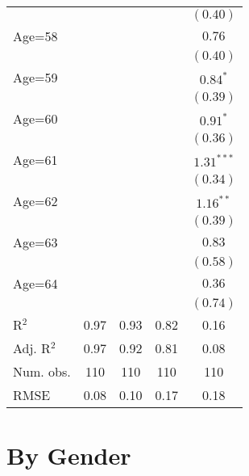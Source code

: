 \documentclass[fullpage]{paper}
\begin{document}
\begin{center}
\begin{longtable}{l c c c c }
            &               &               &               & $(0.40)$      \\
Age=58      &               &               &               & $0.76$        \\
            &               &               &               & $(0.40)$      \\
Age=59      &               &               &               & $0.84^{*}$    \\
            &               &               &               & $(0.39)$      \\
Age=60      &               &               &               & $0.91^{*}$    \\
            &               &               &               & $(0.36)$      \\
Age=61      &               &               &               & $1.31^{***}$  \\
            &               &               &               & $(0.34)$      \\
Age=62      &               &               &               & $1.16^{**}$   \\
            &               &               &               & $(0.39)$      \\
Age=63      &               &               &               & $0.83$        \\
            &               &               &               & $(0.58)$      \\
Age=64      &               &               &               & $0.36$        \\
            &               &               &               & $(0.74)$      \\
\hline
R$^2$       & 0.97          & 0.93          & 0.82          & 0.16          \\
Adj. R$^2$  & 0.97          & 0.92          & 0.81          & 0.08          \\
Num. obs.   & 110           & 110           & 110           & 110           \\
RMSE        & 0.08          & 0.10          & 0.17          & 0.18          \\
\end{longtable}
\end{center}
\section{ By Gender }
\end{document}
